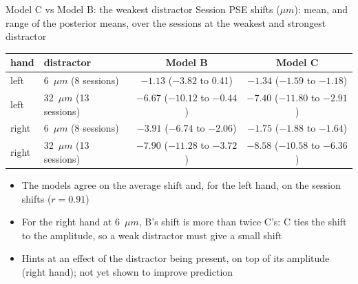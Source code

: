 \begin{frame}{Model C vs Model B: the weakest distractor}
  Session PSE shifts ($\mu m$): mean, and range of the posterior means, over the sessions at
  the weakest and strongest distractor
  \vspace{0.5em}

  \centering\small
  \begin{tabular}{llcc}
    \toprule
    hand & distractor & Model B & Model C \\
    \midrule
    left  & 6~$\mu m$ (8 sessions)   & $-1.13$ ($-3.82$ to 0.41)     & $-1.34$ ($-1.59$ to $-1.18$) \\
    left  & 32~$\mu m$ (13 sessions) & $-6.67$ ($-10.12$ to $-0.44$) & $-7.40$ ($-11.80$ to $-2.91$) \\
    right & 6~$\mu m$ (8 sessions)   & $-3.91$ ($-6.74$ to $-2.06$)  & $-1.75$ ($-1.88$ to $-1.64$) \\
    right & 32~$\mu m$ (13 sessions) & $-7.90$ ($-11.28$ to $-3.72$) & $-8.58$ ($-10.58$ to $-6.36$) \\
    \bottomrule
  \end{tabular}

  \vspace{0.5em}
  \raggedright
  \begin{itemize}
    \item The models agree on the average shift and, for the left hand, on the session shifts
          ($r = 0.91$)
    \item For the right hand at 6~$\mu m$, B's shift is more than twice C's: C ties the shift to
          the amplitude, so a weak distractor must give a small shift
    \item Hints at an effect of the distractor being present, on top of its amplitude (right
          hand); not yet shown to improve prediction
  \end{itemize}
\end{frame}

